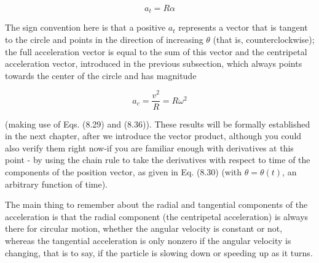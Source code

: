 \documentclass[10pt]{article}
\begin{document}
\begin{equation*}
a_{t}=R \alpha \tag{8.37}
\end{equation*}


The sign convention here is that a positive $a_{t}$ represents a vector that is tangent to the circle and points in the direction of increasing $\theta$ (that is, counterclockwise); the full acceleration vector is equal to the sum of this vector and the centripetal acceleration vector, introduced in the previous subsection, which always points towards the center of the circle and has magnitude


\begin{equation*}
a_{c}=\frac{v^{2}}{R}=R \omega^{2} \tag{8.38}
\end{equation*}


(making use of Eqs. (8.29) and (8.36)). These results will be formally established in the next chapter, after we introduce the vector product, although you could also verify them right now-if you are familiar enough with derivatives at this point - by using the chain rule to take the derivatives with respect to time of the components of the position vector, as given in Eq. (8.30) (with $\theta=\theta(t)$, an arbitrary function of time).

The main thing to remember about the radial and tangential components of the acceleration is that the radial component (the centripetal acceleration) is always there for circular motion, whether the angular velocity is constant or not, whereas the tangential acceleration is only nonzero if the angular velocity is changing, that is to say, if the particle is slowing down or speeding up as it turns.
\end{document}
